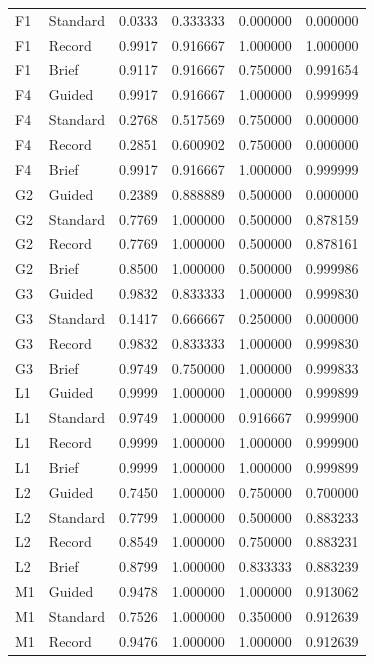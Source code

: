 \begin{longtable}{@{}llrrrr@{}}
F1 & Standard & 0.0333 & 0.333333 & 0.000000 & 0.000000 \\
F1 & Record & 0.9917 & 0.916667 & 1.000000 & 1.000000 \\
F1 & Brief & 0.9117 & 0.916667 & 0.750000 & 0.991654 \\
\addlinespace[3pt]
F4 & Guided & 0.9917 & 0.916667 & 1.000000 & 0.999999 \\
F4 & Standard & 0.2768 & 0.517569 & 0.750000 & 0.000000 \\
F4 & Record & 0.2851 & 0.600902 & 0.750000 & 0.000000 \\
F4 & Brief & 0.9917 & 0.916667 & 1.000000 & 0.999999 \\
\addlinespace[3pt]
G2 & Guided & 0.2389 & 0.888889 & 0.500000 & 0.000000 \\
G2 & Standard & 0.7769 & 1.000000 & 0.500000 & 0.878159 \\
G2 & Record & 0.7769 & 1.000000 & 0.500000 & 0.878161 \\
G2 & Brief & 0.8500 & 1.000000 & 0.500000 & 0.999986 \\
\addlinespace[3pt]
G3 & Guided & 0.9832 & 0.833333 & 1.000000 & 0.999830 \\
G3 & Standard & 0.1417 & 0.666667 & 0.250000 & 0.000000 \\
G3 & Record & 0.9832 & 0.833333 & 1.000000 & 0.999830 \\
G3 & Brief & 0.9749 & 0.750000 & 1.000000 & 0.999833 \\
\addlinespace[3pt]
L1 & Guided & 0.9999 & 1.000000 & 1.000000 & 0.999899 \\
L1 & Standard & 0.9749 & 1.000000 & 0.916667 & 0.999900 \\
L1 & Record & 0.9999 & 1.000000 & 1.000000 & 0.999900 \\
L1 & Brief & 0.9999 & 1.000000 & 1.000000 & 0.999899 \\
\addlinespace[3pt]
L2 & Guided & 0.7450 & 1.000000 & 0.750000 & 0.700000 \\
L2 & Standard & 0.7799 & 1.000000 & 0.500000 & 0.883233 \\
L2 & Record & 0.8549 & 1.000000 & 0.750000 & 0.883231 \\
L2 & Brief & 0.8799 & 1.000000 & 0.833333 & 0.883239 \\
\addlinespace[3pt]
M1 & Guided & 0.9478 & 1.000000 & 1.000000 & 0.913062 \\
M1 & Standard & 0.7526 & 1.000000 & 0.350000 & 0.912639 \\
M1 & Record & 0.9476 & 1.000000 & 1.000000 & 0.912639 \\

\end{longtable}
